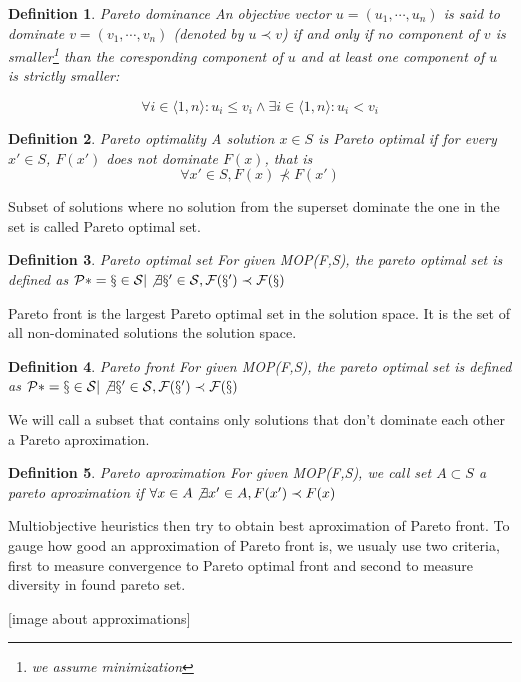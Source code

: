 \documentclass[12pt,oneside]{fithesis2}
\newtheorem{defn}{Definition}
\begin{document}
\begin{defn}{Pareto dominance}
An objective vector $u = (u_1,\cdots,u_n)$ is said to dominate $v = (v_1,\cdots,v_n)$ (denoted by $u \prec v$) if and only if no component of $v$ is smaller\footnote{we assume minimization} than the coresponding component of $u$ and at least one component of $u$ is strictly smaller:

$$ \forall i \in \langle 1,n\rangle: u_i \leq v_i \land \exists i \in \langle 1,n\rangle: u_i < v_i $$
\end{defn}

\begin{defn}{Pareto optimality}
A solution $x \in S$ is Pareto optimal if for every $x' \in S$, $F(x')$ does not dominate $F(x)$, that is $$ \forall x' \in S, F(x) \not \prec F(x') $$
\end{defn}

Subset of solutions where no solution from the superset dominate the one in the set is called Pareto optimal set.

\begin{defn}{Pareto optimal set}
  For given MOP(F,S), the pareto optimal set is defined as $\cal
P* = {x \in S | \not \exists x' \in S, F(x') \prec F(x)}$
\end{defn}

Pareto front is the largest Pareto optimal set in the solution space. It is the set of all non-dominated solutions the solution space. 

\begin{defn}{Pareto front}
  For given MOP(F,S), the pareto optimal set is defined as $\cal
P* = {x \in S | \not \exists x' \in S, F(x') \prec F(x)} $
\end{defn}

We will call a subset that contains only solutions that don't dominate each other a Pareto aproximation.

\begin{defn}{Pareto aproximation}
  For given MOP(F,S), we call set $A \subset S$ a  pareto aproximation if $\forall x \in A \not \exists x' \in A, F(x') \prec F(x)$
\end{defn}

Multiobjective heuristics then try to obtain best aproximation of Pareto front. To gauge how good an approximation of Pareto front is, we usualy use two criteria, first to measure convergence to Pareto optimal front and second to measure diversity in found pareto set.

[image about approximations]
\end{document}
